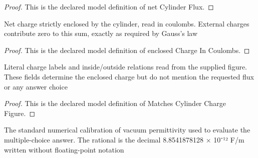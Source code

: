 \begin{proof}
  This is the declared model definition of net Cylinder Flux.
\end{proof}
\begin{definition}
  \label{def:physics:phyx-mini-0848:phyxminiproblems-problemphyxmini0848-enclosedchargeincoulombs}
  Net charge strictly enclosed by the cylinder, read in coulombs. External charges contribute zero to this sum, exactly as required by Gauss's law
\end{definition}
\begin{proof}
  This is the declared model definition of enclosed Charge In Coulombs.
\end{proof}
\begin{definition}
  \label{def:physics:phyx-mini-0848:phyxminiproblems-problemphyxmini0848-matchescylinderchargefigure}
  Literal charge labels and inside/outside relations read from the supplied figure. These fields determine the enclosed charge but do not mention the requested flux or any answer choice
\end{definition}
\begin{proof}
  This is the declared model definition of Matches Cylinder Charge Figure.
\end{proof}
\begin{definition}
  \label{def:physics:phyx-mini-0848:phyxminiproblems-problemphyxmini0848-usesstandardvacuumpermittivity}
  The standard numerical calibration of vacuum permittivity used to evaluate the multiple-choice answer. The rational is the decimal 8.8541878128 × 10⁻¹² F/m written without floating-point notation
\end{definition}
